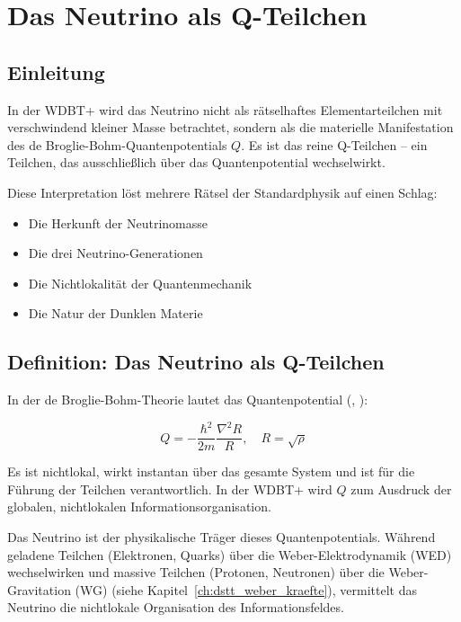 
\chapter{Das Neutrino als Q-Teilchen}
\label{ch:neutrino}

\section{Einleitung}
\label{sec:nu_einleitung}

In der WDBT+ wird das Neutrino nicht als rätselhaftes Elementarteilchen mit verschwindend kleiner Masse betrachtet, sondern als die materielle Manifestation des de Broglie-Bohm-Quantenpotentials \( Q \). Es ist das reine Q-Teilchen – ein Teilchen, das ausschließlich über das Quantenpotential wechselwirkt.

Diese Interpretation löst mehrere Rätsel der Standardphysik auf einen Schlag:

\begin{itemize}
    \item Die Herkunft der Neutrinomasse
    \item Die drei Neutrino-Generationen
    \item Die Nichtlokalität der Quantenmechanik
    \item Die Natur der Dunklen Materie
\end{itemize}

\section{Definition: Das Neutrino als Q-Teilchen}
\label{sec:nu_definition}

In der de Broglie-Bohm-Theorie lautet das Quantenpotential (\cite{Bohm1952a}, \cite{Bohm1952b}):

\[
Q = -\frac{\hbar^2}{2m} \frac{\nabla^2 R}{R}, \quad R = \sqrt{\rho}
\]

Es ist nichtlokal, wirkt instantan über das gesamte System und ist für die Führung der Teilchen verantwortlich. In der WDBT+ wird \( Q \) zum Ausdruck der globalen, nichtlokalen Informationsorganisation.

Das Neutrino ist der physikalische Träger dieses Quantenpotentials. Während geladene Teilchen (Elektronen, Quarks) über die Weber-Elektrodynamik (WED) wechselwirken und massive Teilchen (Protonen, Neutronen) über die Weber-Gravitation (WG) (siehe Kapitel~\ref{ch:dstt_weber_kraefte}), vermittelt das Neutrino die nichtlokale Organisation des Informationsfeldes.

